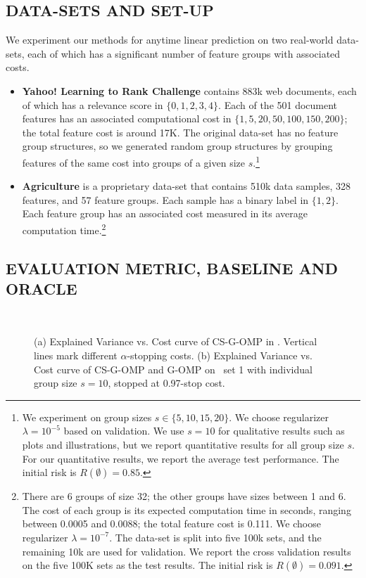 \subsection{DATA-SETS AND SET-UP}
We experiment our methods for anytime linear prediction on two real-world data-sets,
each of which has a significant number of feature groups with associated costs. 

\begin{itemize}[leftmargin=*]
\item \textbf{Yahoo! Learning to Rank Challenge} \citep{yahoo_ltr}
contains 883k web documents, each of which has a relevance score in $\{0, 1, 2, 3, 4\}$. Each of the 501 document features has an associated computational cost in 
$\{ 1, 5, 20, 50, 100, 150, 200\}$; the total feature cost is around 17K. The original data-set has no feature group structures, so we generated random group structures by grouping features of the same cost into groups of a given size $s$.\footnote{We experiment on group sizes $s \in \{ 5, 10, 15, 20 \}$. We choose regularizer 
$\lambda = 10^{-5}$ based on validation. We use 
$s=10$ for qualitative results such as plots and illustrations, but we report quantitative results for all group size $s$. For our quantitative results, we report the average test performance. The initial risk is $R(\emptyset)=0.85$.}

\item \textbf{Agriculture} is a proprietary data-set that contains 510k data samples, 328 features, and 57 feature groups. Each sample has a binary label in $\{1, 2\}$. Each feature group has an associated cost measured in its 
average computation time.\footnote{
There are 6 groups of size 32; the other groups have sizes between 1 and 6. 
The cost of each group is its expected computation time in seconds, ranging between 0.0005 and 0.0088; the total feature cost is 0.111. 
We choose regularizer $\lambda = 10^{-7}$. The data-set is 
split into five 100k sets, and the remaining 10k are used for validation. We report the cross validation results on the five 100K sets as the test results. The initial risk is $R(\emptyset) = 0.091$.}
\end{itemize}

\subsection{EVALUATION METRIC, BASELINE AND ORACLE}
\label{sec:timeliness}
\begin{figure}[t]
\centering
{}
~
\label{fig:timeliness}
\caption{(a) Explained Variance vs. Cost curve of CS-G-OMP in
\YahooLTR. Vertical lines mark different $\alpha$-stopping costs.  (b) Explained Variance vs. Cost curve of CS-G-OMP and G-OMP on \YahooLTR\, set 1 with individual group size $s=10$, stopped at 0.97-stop cost.}
\end{figure}

